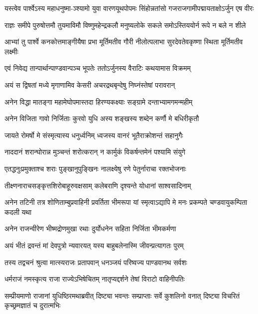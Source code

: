 \twolineshloka
{यस्त्वेव पार्श्वेऽस्य महाधनुष्मा-ञ्श्यामो युवा वारणयूथपोपमः}
{सिंहोन्नतांसो गजराजगामीपद्मायताक्षोऽर्जुन एष वीरः}


\twolineshloka
{राज्ञः समीपे पुरुषोत्तमौ तुयमाविमौ विष्णुमहेन्द्रकलौ}
{मनुष्यलोके सकले समोऽस्तिययोर्न रूपे न बले न शीले}


\twolineshloka
{आभ्यां तु पार्श्वे कनकोत्तमाङ्गीयैषा प्रभा मूर्तिमतीव गौरी}
{नीलोत्पलाभा सुरदेवतेवकृष्णा स्थिता मूर्तिमतीव लक्ष्मीः}



\twolineshloka
{एवं निवेद्य तान्पार्थान्पाण्डवान्पञ्च भूपतेः}
{ततोऽर्जुनस्य वैराटिः कथयामास विक्रमम्}


\twolineshloka
{अयं स द्विषतां मध्ये मृगाणामिव केसरी}
{अचरद्रथबृन्देषु निघ्नंस्तेषां परावरान्}


\twolineshloka
{अनेन विद्धा मातङ्गा महामेघोपमास्तदा}
{हिरण्यकक्ष्याः सङ्ग्रामे दन्ताभ्यामगमन्महीम्}


\twolineshloka
{अनेन विजिता गावो निर्जिताः कुरवो युधि}
{अस्य शङ्खस्य शब्देन कर्णौ मे बधिरीकृतौ}


\twolineshloka
{जायते रोमर्षो मे संस्मृत्यास्य धनुर्ध्वनिम्}
{ध्वजस्य वानरं भूतैराक्रोशन्तं सहानुगैः}


\twolineshloka
{नाददानं शरान्घोरान्न मुञ्चन्तं शरोत्करान्}
{न कार्मुकं विकर्षन्तमेनं पश्यामि संयुगे}


\twolineshloka
{एतद्धनुःप्रमुक्ताश्च शराः पुङ्खानुपुङ्खिनः}
{नालक्ष्येषु रणे पेतुर्नाराचा रक्तभोजनाः}


\twolineshloka
{तीक्ष्णनाराचसङ्कृत्तशिरोबाहूरुवक्षसाम्}
{कलेबराणि दृश्यन्ते योधानां साश्वसादिनाम्}


\threelineshloka
{अनेन तटिनी तत्र शोणिताम्बुप्रवाहिनी}
{प्रवर्तिता भीमरूपा यां स्मृत्वाऽद्यापि मे मनः}
{प्रकम्पते चण्डवायुकम्पिता कदली यथा}


\twolineshloka
{अनेन राजन्वीरेण भीष्मद्रोणमुखा रथाः}
{दुर्योधनेन सहिता निर्जिता भीमकर्मणा}


\twolineshloka
{अयं भीतं द्रवन्तं मां देवपुत्रो न्यवारयत्}
{यस्य बाहुबलेनास्मि जीवन्प्रत्यागतः पुरम्}



\twolineshloka
{तस्य तद्वचनं श्रुत्वा मात्स्यराजः प्रतापवान्}
{धनञ्जयं परिष्वज्य पाण्डवानथ सर्वशः}


\twolineshloka
{धर्मराजं नमस्कृत्य राजा राज्येऽभिषेचितम्}
{नातृप्यद्दर्शने तेषां विराटो वाहिनीपतिः}


\threelineshloka
{सम्प्रीयमाणो राजानां युधिष्ठिरमथाब्रवीत्}
{दिष्ट्या भवन्तः सम्प्राप्ताः सर्वे कुशलिनो वनात्}
{दिष्ट्या विचरितं कृच्छ्रमज्ञातं च दुरात्मभिः}



